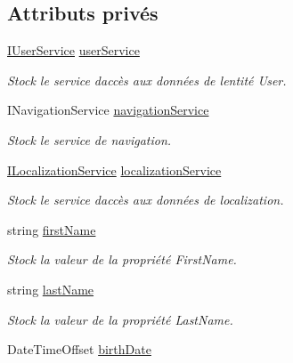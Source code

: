 \subsection*{Attributs privés}
\begin{DoxyCompactItemize}
\item 
\hyperlink{interface_boxes_1_1_services_1_1_user_1_1_i_user_service}{I\+User\+Service} \hyperlink{class_boxes_1_1_view_models_1_1_register_view_model_acb915d2826a23f07e311c904ddf6fac9}{user\+Service}
\begin{DoxyCompactList}\small\item\em Stock le service d\textquotesingle{}accès aux données de l\textquotesingle{}entité User. \end{DoxyCompactList}\item 
I\+Navigation\+Service \hyperlink{class_boxes_1_1_view_models_1_1_register_view_model_afcceb72df99eab11056fff6f93847e17}{navigation\+Service}
\begin{DoxyCompactList}\small\item\em Stock le service de navigation. \end{DoxyCompactList}\item 
\hyperlink{interface_boxes_1_1_services_1_1_localization_1_1_i_localization_service}{I\+Localization\+Service} \hyperlink{class_boxes_1_1_view_models_1_1_register_view_model_a7ebf08d118dd2ad8ef90d36373b1185f}{localization\+Service}
\begin{DoxyCompactList}\small\item\em Stock le service d\textquotesingle{}accès aux données de localization. \end{DoxyCompactList}\item 
string \hyperlink{class_boxes_1_1_view_models_1_1_register_view_model_ae36409fb1c802e10b570b441fd388884}{first\+Name}
\begin{DoxyCompactList}\small\item\em Stock la valeur de la propriété {\ttfamily First\+Name}. \end{DoxyCompactList}\item 
string \hyperlink{class_boxes_1_1_view_models_1_1_register_view_model_ac5c719764dfe7bd968a92f012ef5e4b7}{last\+Name}
\begin{DoxyCompactList}\small\item\em Stock la valeur de la propriété {\ttfamily Last\+Name}. \end{DoxyCompactList}\item 
Date\+Time\+Offset \hyperlink{class_boxes_1_1_view_models_1_1_register_view_model_a6fd9dab40e9ba9e93904072a061f5a6a}{birth\+Date}

\end{DoxyCompactItemize}
